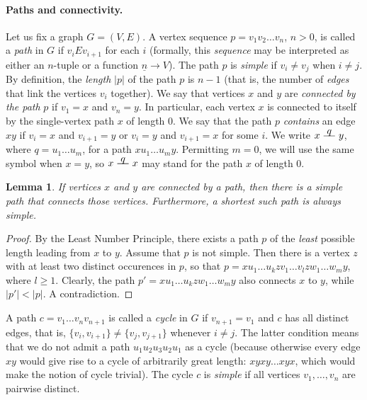 \documentclass[12pt,notitlepage]{article}
\theoremstyle{plain}
\newtheorem{lemma}[thm]{Lemma}
\theoremstyle{definition}
\theoremstyle{plain}
\newcommand{\ul}[1]{\underline{#1}}
\newcommand{\1}{\mathbf{1}}
\newcommand{\0}{\mathbf{0}}
\newcommand{\pth}[1]{\overset{\raisebox{0.25em}{$ #1 $}}{\relbar\hspace{-.8mm}\relbar}}
\begin{document}
\paragraph{Paths and connectivity.} Let us fix a graph $G = (V, E)$. A vertex sequence $p = v_1 v_2 \ldots v_n$, $n > 0$, is called a \emph{path} in $G$ if $v_i E v_{i + 1}$ for each $i$ (formally, this \emph{sequence} may be interpreted as either an $n$-tuple or a function $\ul{n} \to V$). The path $p$ is \emph{simple} if $v_i \neq v_j$ when $i \neq j$. By definition, the \emph{length} $|p|$ of the path $p$ is $n - 1$ (that is, the number of \emph{edges} that link the vertices $v_i$ together). We say that vertices $x$ and $y$ are \emph{connected by the path} $p$ if $v_1 = x$ and $v_n = y$. In particular, each vertex $x$ is connected to itself by the single-vertex path $x$ of length $0$. We say that the path $p$ \emph{contains} an edge $xy$ if $v_i = x$ and $v_{i + 1} = y$ or $v_i = y$ and $v_{i + 1} = x$ for some $i$. We write $x \pth{q} y$, where $q = u_1 \ldots u_m$, for a path $x u_1 \ldots u_m y$. Permitting $m = 0$, we will use the same symbol when $x = y$, so $x \pth{q} x$ may stand for the path $x$ of length $0$.

\begin{lemma}\label{L14:simpl_path}
If vertices $x$ and $y$ are connected by a path, then there is a \emph{simple} path that connects those vertices. Furthermore, a shortest such path is always simple.
\end{lemma}
\begin{proof}
By the Least Number Principle, there exists a path $p$ of the \emph{least} possible length leading from $x$ to $y$. Assume that $p$ is not simple. Then there is a vertex $z$ with at least two distinct occurences in $p$, so that $p = x u_1 \ldots u_k z v_1 \ldots v_l z w_1 \ldots w_m y$, where $l \geq 1$. Clearly, the path $p' = x u_1 \ldots u_k z w_1 \ldots w_m y$ also connects $x$ to $y$, while $|p'| < |p|$. A contradiction.
\end{proof}

A path $c = v_1 \ldots v_n v_{n + 1}$ is called a \emph{cycle} in $G$ if $v_{n + 1} = v_1$ and $c$ has all distinct edges, that is, $\{ v_i, v_{i+1} \} \neq \{ v_j, v_{j + 1}\}$ whenever $i \neq j$. The latter condition means that we do not admit a path $u_1 u_2 u_3 u_2 u_1$ as a cycle (because otherwise every edge $x y$ would give rise to a cycle of arbitrarily great length: $x y x y \ldots x y x$, which would make the notion of cycle trivial). The cycle $c$ is \emph{simple} if all vertices $v_1, \ldots, v_n$ are pairwise distinct.
\end{document}
